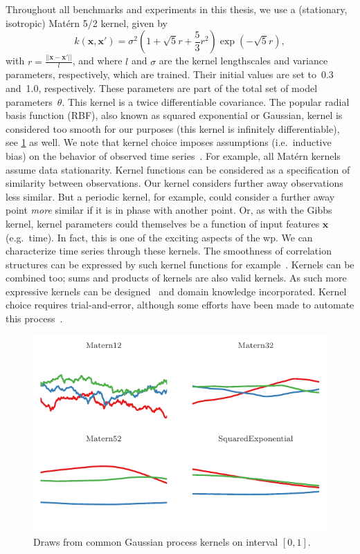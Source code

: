 Throughout all benchmarks and experiments in this thesis, we use a (stationary, isotropic) Matérn 5/2 kernel, given by
\begin{equation}
  \label{eq:matern}
  k(\textbf{x}, \textbf{x}') = \sigma^2 (1 + \sqrt{5} r + \frac53 r^2) \exp(-\sqrt{5}r),
\end{equation}
with $r = \frac{||\textbf{x} - \textbf{x}'||}{l}$, and where $l$ and $\sigma$ are the kernel lengthscales and variance parameters, respectively, which are trained.
Their initial values are set to~0.3 and~1.0, respectively.
These parameters are part of the total set of model parameters~$\theta$.
This kernel is a twice differentiable covariance.
The popular radial basis function (RBF), also known as squared exponential or Gaussian, kernel is considered too smooth for our purposes (this kernel is infinitely differentiable), see \cref{fig:kernel-draws} as well.
We note that kernel choice imposes assumptions (i.e.~inductive bias) on the behavior of observed time series~\parencite[see also][chapter 2]{Duvenaud2014}.
For example, all Matérn kernels assume data stationarity.
Kernel functions can be considered as a specification of similarity between observations.
Our kernel considers further away observations less similar.
But a periodic kernel, for example, could consider a further away point \emph{more} similar if it is in phase with another point.
Or, as with the Gibbs kernel, kernel parameters could themselves be a function of input features $\mathbf{x}$ (e.g.~time).
In fact, this is one of the exciting aspects of the \gls{wp}.
We can characterize time series through these kernels.
The smoothness of correlation structures can be expressed by such kernel functions for example~\parencite{Fyshe2012, Fox2015, Foti2019}.
Kernels can be combined too; sums and products of kernels are also valid kernels.
As such more expressive kernels can be designed~\parencite{Gonen2011} and domain knowledge incorporated.
Kernel choice requires trial-and-error, although some efforts have been made to automate this process~\parencite[see e.g.][]{Steinruecken2019}.


\begin{figure}[t]
  \centering
  \includegraphics[width=\textwidth]{fig/studies/kernels}
  \caption{
    Draws from common Gaussian process kernels on interval $\left[ {0,1} \right]$.
  }\label{fig:kernel-draws}
\end{figure}


